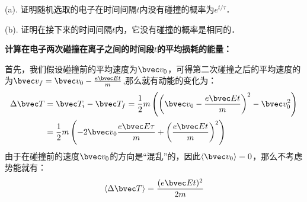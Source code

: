 \begin{example}{}
(a). 证明随机选取的电子在时间间隔$t$内没有碰撞的概率为$e^{t/\tau}$．

(b). 证明在接下来的时间间隔$t$内，它没有碰撞的概率是相同的．
\end{example}
\begin{example}{}
\textbf{计算在电子两次碰撞在离子之间的时间段$t$的平均损耗的能量：}

首先，我们假设碰撞前的平均速度为$\bvec v_0$，可得第二次碰撞之后的平均速度的为$\bvec v_f=\bvec v_0 -\frac{e\bvec E t}{m}$,那么就有动能的变化为：
\begin{align}
\Delta \bvec T &= \bvec T_i-\bvec T_f=\frac{1}{2}m\left(\left(\bvec v_0 -\frac{e\bvec E t}{m}\right)^2-\bvec v_0^2\right)\\
&=\frac{1}{2}m\left(-2\bvec v_0\frac{e\bvec E \tau}{m}+\left(\frac{e\bvec E t}{m}\right)^2\right)\\
\end{align}
由于在碰撞前的速度$\bvec v_0$的方向是“混乱”的，因此$\langle \bvec v_0\rangle = 0$，那么不考虑势能就有：
\begin{equation}
\langle \Delta \bvec T \rangle = \frac{(e\bvec E t)^2}{2m}
\end{equation}
\end{example}
